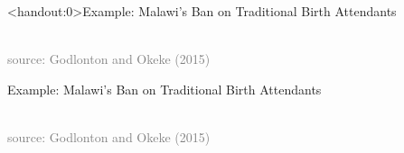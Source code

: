 \documentclass[10pt,xcolor=table,ignorenonframetext,aspectratio=169]{beamer}
\begin{document}
\begin{frame}<handout:0>{Example:  Malawi's Ban on Traditional Birth Attendants}

\medskip
\begin{center}
	 \\
	\textcolor{gray}{\tiny{source:  Godlonton and Okeke (2015)}}
\end{center}

\end{frame}



\begin{frame}{Example:  Malawi's Ban on Traditional Birth Attendants}

\medskip
\begin{center}
	 \\
	\textcolor{gray}{\tiny{source:  Godlonton and Okeke (2015)}}
\end{center}

\end{frame}


\end{document}
